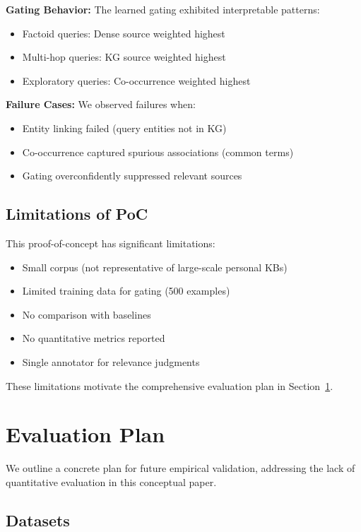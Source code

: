 \documentclass[11pt,a4paper]{article}
\begin{document}
\textbf{Gating Behavior:} The learned gating exhibited interpretable patterns:
\begin{itemize}
    \item Factoid queries: Dense source weighted highest
    \item Multi-hop queries: KG source weighted highest
    \item Exploratory queries: Co-occurrence weighted highest
\end{itemize}

\textbf{Failure Cases:} We observed failures when:
\begin{itemize}
    \item Entity linking failed (query entities not in KG)
    \item Co-occurrence captured spurious associations (common terms)
    \item Gating overconfidently suppressed relevant sources
\end{itemize}

\subsection{Limitations of PoC}

This proof-of-concept has significant limitations:
\begin{itemize}
    \item Small corpus (not representative of large-scale personal KBs)
    \item Limited training data for gating (500 examples)
    \item No comparison with baselines
    \item No quantitative metrics reported
    \item Single annotator for relevance judgments
\end{itemize}

These limitations motivate the comprehensive evaluation plan in Section~\ref{sec:evaluation_plan}.

\section{Evaluation Plan}
\label{sec:evaluation_plan}

We outline a concrete plan for future empirical validation, addressing the lack of quantitative evaluation in this conceptual paper.

\subsection{Datasets}
\end{document}
